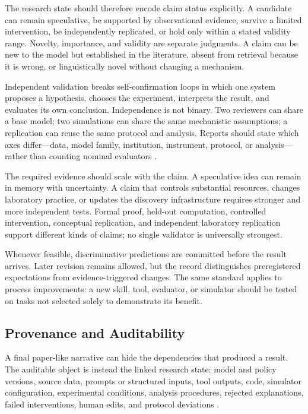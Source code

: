 \documentclass[11pt, a4paper, copyright]{google}
\begin{document}
The research state should therefore encode claim status explicitly. A candidate can remain speculative, be supported by observational evidence, survive a limited intervention, be independently replicated, or hold only within a stated validity range. Novelty, importance, and validity are separate judgments. A claim can be new to the model but established in the literature, absent from retrieval because it is wrong, or linguistically novel without changing a mechanism.

Independent validation breaks self-confirmation loops in which one system proposes a hypothesis, chooses the experiment, interprets the result, and evaluates its own conclusion. Independence is not binary. Two reviewers can share a base model; two simulations can share the same mechanistic assumptions; a replication can reuse the same protocol and analysis. Reports should state which axes differ---data, model family, institution, instrument, protocol, or analysis---rather than counting nominal evaluators \citep{nosek2015top,gottweis2026coscientist,ghareeb2026robin}.

The required evidence should scale with the claim. A speculative idea can remain in memory with uncertainty. A claim that controls substantial resources, changes laboratory practice, or updates the discovery infrastructure requires stronger and more independent tests. Formal proof, held-out computation, controlled intervention, conceptual replication, and independent laboratory replication support different kinds of claims; no single validator is universally strongest.

Whenever feasible, discriminative predictions are committed before the result arrives. Later revision remains allowed, but the record distinguishes preregistered expectations from evidence-triggered changes. The same standard applies to process improvements: a new skill, tool, evaluator, or simulator should be tested on tasks not selected solely to demonstrate its benefit.

\subsection{Provenance and Auditability}
\label{subsec:provenance-auditability}

A final paper-like narrative can hide the dependencies that produced a result. The auditable object is instead the linked research state: model and policy versions, source data, prompts or structured inputs, tool outputs, code, simulator configuration, experimental conditions, analysis procedures, rejected explanations, failed interventions, human edits, and protocol deviations \citep{wilkinson2016fair,nosek2015top}.
\end{document}
